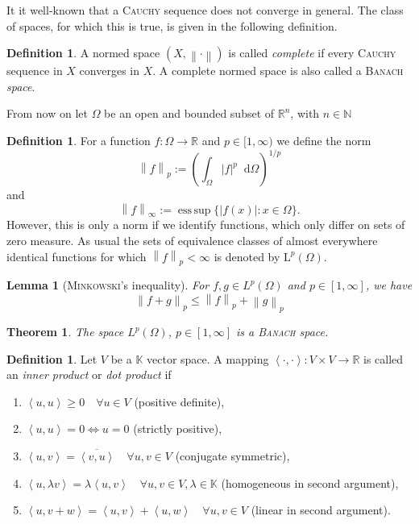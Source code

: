 \documentclass[12pt,a4paper,twoside, open=right]{scrreprt}
\theoremstyle{definition}
\newtheorem{defn}[auf]{Definition}
\theoremstyle{plain}
\newtheorem{sa}[auf]{Theorem}
\newtheorem{lem}[auf]{Lemma}
\DeclareMathOperator*{\esssup}{ess\,sup} %
\newcommand{\abs}[1]{\left\vert #1\right\vert}
\newcommand{\dotp}[2]{\left\langle #1,#2\right\rangle}
\newcommand{\rr}{\mathbb{R}}
\newcommand{\kk}{\mathbb{K}}
\newcommand{\nn}{\mathbb{N}}
\newcommand{\norm}[1]{\left\lVert#1\right\rVert}
\newcommand{\D}{\mathop{}\!\mathrm{d}}
\begin{document}
It it well-known that a \textsc{Cauchy} sequence does not converge in general. The class of spaces, for which this is true, is given in the following definition.
\begin{defn}
    A normed space $(X, \norm{\cdot})$ is called \emph{complete} if every \textsc{Cauchy} sequence in $X$ converges in $X$. A complete normed space is also called a \textsc{Banach} \emph{space}.
\end{defn}
From now on let $\Omega$ be an open and bounded subset of $\rr^n$, with $n\in\nn$
\begin{defn}
    For a function $f\colon\Omega\to\rr$ and $p\in[1,\infty)$ we define the norm
     \begin{equation}
    \norm{f}_{p}:=\left(\int_\Omega\abs{f}^p\D\Omega\right)^{1/p}
    \end{equation}
    and
     \begin{equation}
    \norm{f}_{\infty}:=\esssup\{\abs{f(x)}\colon x\in\Omega\}.
    \end{equation}
    However, this is only a norm if we identify functions, which only differ on sets of zero measure. As usual the sets of equivalence classes of almost everywhere identical functions for which $\norm{f}_p<\infty$ is denoted by $\mathrm{L}^p(\Omega)$.
\end{defn}
\begin{lem}[\textsc{Minkowski}'s inequality]
    For $f,g\in L^p(\Omega)$ and $p\in[1,\infty]$, we have
    \begin{equation}
        \norm{f+g}_p\le\norm{f}_p+\norm{g}_p
    \end{equation}
\end{lem}
\begin{sa}
    The space $L^p(\Omega)$, $p\in[1,\infty]$ is a \textsc{Banach} space.
\end{sa}
\begin{defn}
    Let $V$ be a $\kk$ vector space. A mapping $\dotp{\cdot}{\cdot}\colon V\times V\to\rr$ is called an \emph{inner product} or \emph{dot product} if 
    \begin{enumerate}
        \item $\dotp{u}{u} \ge 0 \quad \forall u\in V$ (positive definite),
        \item $\dotp{u}{u} = 0 \Leftrightarrow u=0 $  (strictly positive),
        \item $\dotp{u}{v} = \overline{\dotp{v}{u}}   \quad\forall u,v\in V$ (conjugate symmetric),
        \item $\dotp{u}{\lambda v} = \lambda\dotp{u}{v} \quad\forall u,v\in V,\lambda\in\kk$ (homogeneous in second argument),
        \item $\dotp{u}{v+w} =\dotp{u}{v}+\dotp{u}{w} \quad\forall u,v\in V$ (linear in second argument).
    \end{enumerate}
\end{defn}
\end{document}
